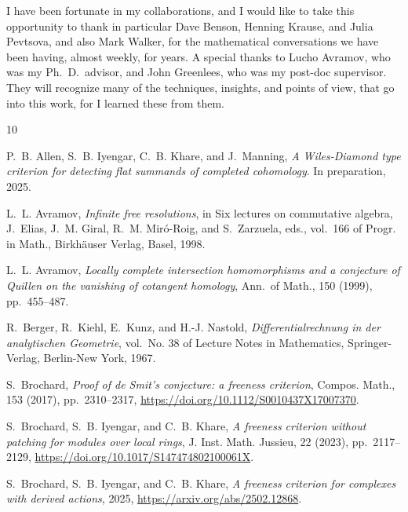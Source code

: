\documentclass[twoside,leqno]{article}
\begin{document}
I have been fortunate in my collaborations, and I would  like to take this opportunity to thank in  particular Dave Benson, Henning Krause, and Julia Pevtsova, and also Mark Walker, for the mathematical conversations we have been having, almost weekly, for years. A special thanks to Lucho Avramov, who was my Ph.\ D.\ advisor, and John Greenlees, who was my post-doc supervisor. They will  recognize many of the techniques, insights, and points of view, that go into this work, for I learned these from them.


\newcommand{\noopsort}[1]{}
\begin{thebibliography}{10}

{\sc P.~B. Allen, S.~B. Iyengar, C.~B. Khare, and J.~Manning}, {\em A
  {W}iles-{D}iamond type criterion for detecting flat summands of completed
  cohomology}.
\newblock In preparation, 2025.

{\sc L.~L. Avramov}, {\em {Infinite free resolutions}}, in Six lectures on
  commutative algebra, J.~Elias, J.~M. Giral, R.~M. Mir\'o-Roig, and
  S.~Zarzuela, eds., vol.~166 of Progr. in Math., Birkh\"auser Verlag, Basel,
  1998.

{\sc L.~L. Avramov}, {\em {Locally complete intersection homomorphisms and a
  conjecture of Quillen on the vanishing of cotangent homology}}, Ann.\ of
  Math., 150 (1999), pp.~455--487.

{\sc R.~Berger, R.~Kiehl, E.~Kunz, and H.-J. Nastold}, {\em
  Differentialrechnung in der analytischen {G}eometrie}, vol.~No. 38 of Lecture
  Notes in Mathematics, Springer-Verlag, Berlin-New York, 1967.

{\sc S.~Brochard}, {\em Proof of de {S}mit's conjecture: a freeness criterion},
  Compos. Math., 153 (2017), pp.~2310--2317,
  \url{https://doi.org/10.1112/S0010437X17007370}.

{\sc S.~Brochard, S.~B. Iyengar, and C.~B. Khare}, {\em A freeness criterion
  without patching for modules over local rings}, J. Inst. Math. Jussieu, 22
  (2023), pp.~2117--2129,
  \url{https://doi.org/10.1017/S147474802100061X}.

{\sc S.~Brochard, S.~B. Iyengar, and C.~B. Khare}, {\em A freeness criterion
  for complexes with derived actions}, 2025,
  \url{https://arxiv.org/abs/2502.12868}.


\end{thebibliography}
\end{document}
